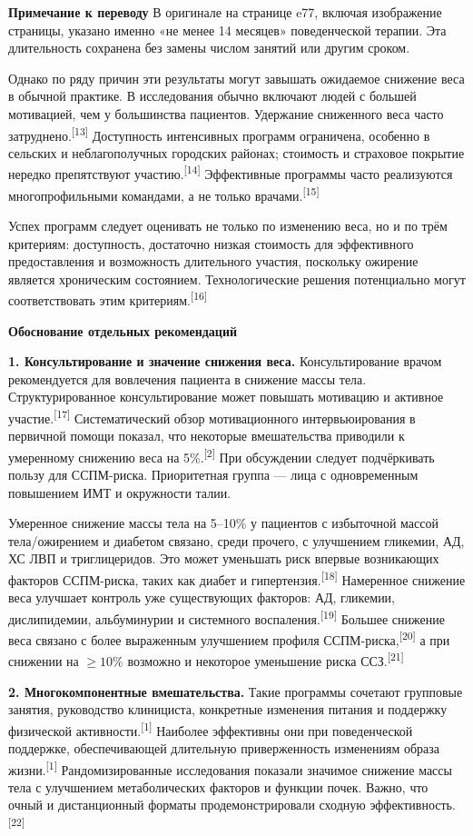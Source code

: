 \documentclass[11pt,a4paper]{article}
\newcommand{\src}[1]{\textsuperscript{[#1]}}
\newcommand{\editorial}[1]{\par\begingroup\small\color{black!70}\textbf{Примечание к переводу} #1\par\endgroup}
\newcommand{\heading}[1]{\par\medskip\textbf{#1}\par}
\begin{document}
\editorial{В оригинале на странице e77, включая изображение страницы, указано именно «не менее 14 месяцев» поведенческой терапии. Эта длительность сохранена без замены числом занятий или другим сроком.}

Однако по ряду причин эти результаты могут завышать ожидаемое снижение веса в обычной практике. В исследования обычно включают людей с большей мотивацией, чем у большинства пациентов. Удержание сниженного веса часто затруднено.\src{13} Доступность интенсивных программ ограничена, особенно в сельских и неблагополучных городских районах; стоимость и страховое покрытие нередко препятствуют участию.\src{14} Эффективные программы часто реализуются многопрофильными командами, а не только врачами.\src{15}

Успех программ следует оценивать не только по изменению веса, но и по трём критериям: доступность, достаточно низкая стоимость для эффективного предоставления и возможность длительного участия, поскольку ожирение является хроническим состоянием. Технологические решения потенциально могут соответствовать этим критериям.\src{16}

\heading{Обоснование отдельных рекомендаций}
\textbf{1. Консультирование и значение снижения веса.} Консультирование врачом рекомендуется для вовлечения пациента в снижение массы тела. Структурированное консультирование может повышать мотивацию и активное участие.\src{17} Систематический обзор мотивационного интервьюирования в первичной помощи показал, что некоторые вмешательства приводили к умеренному снижению веса на 5\%.\src{2} При обсуждении следует подчёркивать пользу для ССПМ-риска. Приоритетная группа --- лица с одновременным повышением ИМТ и окружности талии.

Умеренное снижение массы тела на 5--10\% у пациентов с избыточной массой тела/ожирением и диабетом связано, среди прочего, с улучшением гликемии, АД, ХС ЛВП и триглицеридов. Это может уменьшать риск впервые возникающих факторов ССПМ-риска, таких как диабет и гипертензия.\src{18} Намеренное снижение веса улучшает контроль уже существующих факторов: АД, гликемии, дислипидемии, альбуминурии и системного воспаления.\src{19} Большее снижение веса связано с более выраженным улучшением профиля ССПМ-риска,\src{20} а при снижении на $\geq10\%$ возможно и некоторое уменьшение риска ССЗ.\src{21}

\textbf{2. Многокомпонентные вмешательства.} Такие программы сочетают групповые занятия, руководство клинициста, конкретные изменения питания и поддержку физической активности.\src{1} Наиболее эффективны они при поведенческой поддержке, обеспечивающей длительную приверженность изменениям образа жизни.\src{1} Рандомизированные исследования показали значимое снижение массы тела с улучшением метаболических факторов и функции почек. Важно, что очный и дистанционный форматы продемонстрировали сходную эффективность.\src{22}
\end{document}
